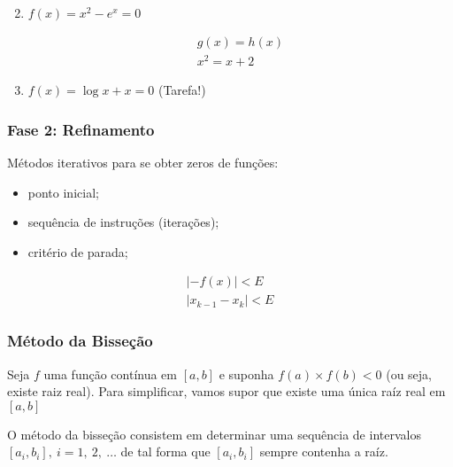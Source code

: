 \documentclass[a4paper,oneside,article,table]{article}
\begin{document}
\begin{enumerate}[label=\alph*]
\begin{multicols}{2}
        \end{multicols}
        \item $f(x) = x^2 - e^x = 0$

                \begin{gather*}
                    g(x) = h(x)\\
                    x^2 = x + 2
                \end{gather*}

            \item $f(x) = \log{x} + x = 0$ (Tarefa!)

        \end{enumerate}

        \subsubsection*{Fase 2: Refinamento}
        Métodos iterativos para se obter zeros de funções:
        \begin{itemize}
            \item ponto inicial;
            \item sequência de instruções (iterações);
            \item critério de parada;
        \end{itemize}

        \begin{gather*}
            |-f(x)| < E\\
            |x_{k-1} - x_k| < E
        \end{gather*}

        \subsubsection*{Método da Bisseção}
        Seja $f$ uma função contínua em $[a,b]$ e suponha $f(a) \times f(b) < 0$ (ou seja, existe raiz real).
        Para simplificar, vamos supor que existe uma única raíz real em $[a,b]$

        O método da bisseção consistem em determinar uma sequência de intervalos $[a_i,b_i],~i = 1,~2,~\ldots$ de tal forma que $[a_i,b_i]$ sempre contenha a raíz.

\end{document}
